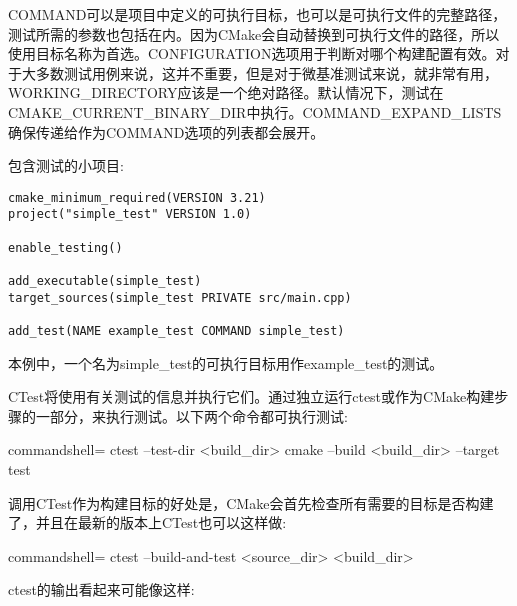COMMAND可以是项目中定义的可执行目标，也可以是可执行文件的完整路径，测试所需的参数也包括在内。因为CMake会自动替换到可执行文件的路径，所以使用目标名称为首选。CONFIGURATION选项用于判断对哪个构建配置有效。对于大多数测试用例来说，这并不重要，但是对于微基准测试来说，就非常有用，WORKING\_DIRECTORY应该是一个绝对路径。默认情况下，测试在CMAKE\_CURRENT\_BINARY\_DIR中执行。COMMAND\_EXPAND\_LISTS确保传递给作为COMMAND选项的列表都会展开。

包含测试的小项目:

\begin{lstlisting}[style=styleCMake]
cmake_minimum_required(VERSION 3.21)
project("simple_test" VERSION 1.0)

enable_testing()

add_executable(simple_test)
target_sources(simple_test PRIVATE src/main.cpp)

add_test(NAME example_test COMMAND simple_test)
\end{lstlisting}

本例中，一个名为simple\_test的可执行目标用作example\_test的测试。

CTest将使用有关测试的信息并执行它们。通过独立运行ctest或作为CMake构建步骤的一部分，来执行测试。以下两个命令都可执行测试:

\begin{tcblisting}{commandshell={}}
ctest --test-dir <build_dir>
cmake --build <build_dir> --target test
\end{tcblisting}

调用CTest作为构建目标的好处是，CMake会首先检查所有需要的目标是否构建了，并且在最新的版本上CTest也可以这样做:

\begin{tcblisting}{commandshell={}}
ctest --build-and-test <source_dir> <build_dir>
\end{tcblisting}

ctest的输出看起来可能像这样:


